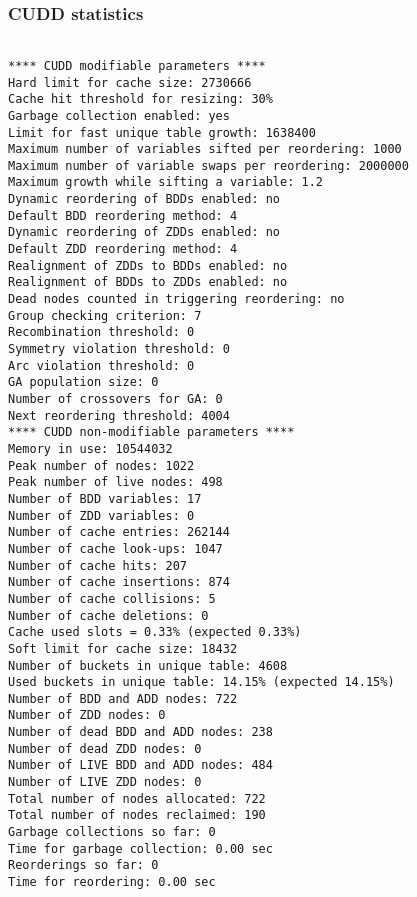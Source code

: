 \documentclass[a4paper]{article}
\begin{document}
\subsubsection*{CUDD statistics}
\begin{verbatim}

**** CUDD modifiable parameters ****
Hard limit for cache size: 2730666
Cache hit threshold for resizing: 30%
Garbage collection enabled: yes
Limit for fast unique table growth: 1638400
Maximum number of variables sifted per reordering: 1000
Maximum number of variable swaps per reordering: 2000000
Maximum growth while sifting a variable: 1.2
Dynamic reordering of BDDs enabled: no
Default BDD reordering method: 4
Dynamic reordering of ZDDs enabled: no
Default ZDD reordering method: 4
Realignment of ZDDs to BDDs enabled: no
Realignment of BDDs to ZDDs enabled: no
Dead nodes counted in triggering reordering: no
Group checking criterion: 7
Recombination threshold: 0
Symmetry violation threshold: 0
Arc violation threshold: 0
GA population size: 0
Number of crossovers for GA: 0
Next reordering threshold: 4004
**** CUDD non-modifiable parameters ****
Memory in use: 10544032
Peak number of nodes: 1022
Peak number of live nodes: 498
Number of BDD variables: 17
Number of ZDD variables: 0
Number of cache entries: 262144
Number of cache look-ups: 1047
Number of cache hits: 207
Number of cache insertions: 874
Number of cache collisions: 5
Number of cache deletions: 0
Cache used slots = 0.33% (expected 0.33%)
Soft limit for cache size: 18432
Number of buckets in unique table: 4608
Used buckets in unique table: 14.15% (expected 14.15%)
Number of BDD and ADD nodes: 722
Number of ZDD nodes: 0
Number of dead BDD and ADD nodes: 238
Number of dead ZDD nodes: 0
Number of LIVE BDD and ADD nodes: 484
Number of LIVE ZDD nodes: 0
Total number of nodes allocated: 722
Total number of nodes reclaimed: 190
Garbage collections so far: 0
Time for garbage collection: 0.00 sec
Reorderings so far: 0
Time for reordering: 0.00 sec 
\end{verbatim}
\end{document}
